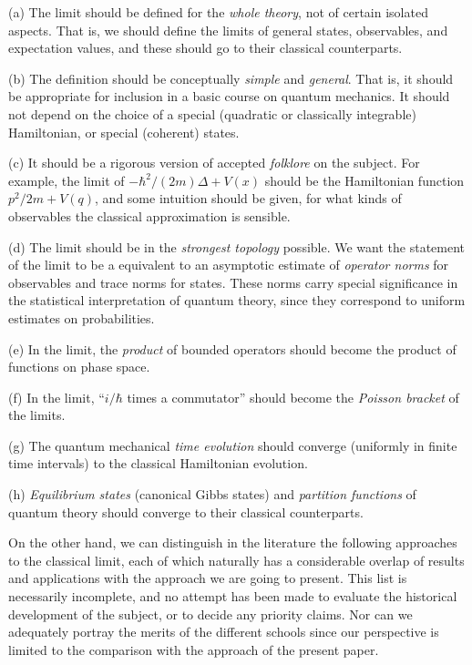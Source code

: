 {\parskip=5pt
\item{(a)}
The limit should be defined for the {\it whole theory}, not of
certain isolated aspects. That is, we should define the limits of
general states, observables, and expectation values, and these
should go to their classical counterparts.
\item{(b)}
The definition should be conceptually {\it simple} and {\it
general}. That is, it should be appropriate for inclusion in a basic
course on quantum mechanics. It should not depend on the choice of a
special (\eg  quadratic or classically integrable) Hamiltonian, or
special (\eg coherent) states.
\item{(c)}
It should be a rigorous version of accepted {\it folklore} on the
subject. For example, the limit of $-\hbar^2/(2m)\Delta +V(x)$
should be the Hamiltonian function $p^2/2m+V(q)$, and some intuition
should be given, for what kinds of observables the classical
approximation is sensible.
\item{(d)}
The limit should be in the {\it strongest topology} possible.
We want the statement of the limit to be a equivalent to an
asymptotic estimate of {\it operator norms} for observables and trace
norms for states. These norms carry special significance in the
statistical interpretation of quantum theory, since they correspond
to uniform estimates on probabilities.
\item{(e)}
In the limit, the {\it product} of bounded operators should become
the product of functions on phase space.
\item{(f)}
In the limit, ``$i/\hbar$ times a commutator'' should
become the {\it Poisson bracket} of the limits.
\item{(g)}
The quantum mechanical {\it time evolution} should converge
(uniformly in finite time intervals) to the classical Hamiltonian
evolution.
\item{(h)}
{\it Equilibrium states} (canonical Gibbs states) and {\it partition
functions} of quantum theory should converge to their classical
counterparts.
\item{}}

\noindent
On the other hand, we can distinguish in the literature the
following approaches to the classical limit, each of which naturally
has a considerable overlap of results and applications with the
approach we are going to present. This list is necessarily
incomplete, and no attempt has been made to evaluate the historical
development of the subject, or to decide any priority claims. Nor
can we adequately portray the merits of the different schools since
our perspective is limited to the comparison with the approach of
the present paper.

